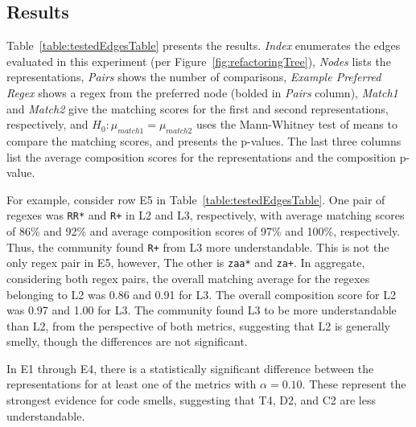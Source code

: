 \subsection{Results}
Table~\ref{table:testedEdgesTable} presents the results. 
\emph{Index}  enumerates the edges  evaluated in this experiment (per Figure~\ref{fig:refactoringTree}), \emph{Nodes} lists the representations, \emph{Pairs} shows the number of comparisons, \emph{Example Preferred Regex} shows a regex from the preferred node (bolded in \emph{Pairs} column), \emph{Match1} and \emph{Match2} give the matching scores for the first and second representations, respectively, and $H_0: \mu_{match1} = \mu_{match2}$ uses the Mann-Whitney test of means to compare the matching scores, and presents the p-values. The last three columns list the average composition scores for the representations and the composition p-value. 

For example, consider row E5 in Table~\ref{table:testedEdgesTable}. 
One pair of regexes was \verb!RR*! and \verb!R+! in L2 and L3, respectively, with average matching scores of 86\%  and 92\% and average composition scores of 97\%  and 100\%, respectively. 
Thus, the community found \verb!R+! from L3 more understandable. 
This is not the only regex pair in E5, however, The other is \verb!zaa*! and \verb!za+!. %
In aggregate, considering both regex pairs, the overall matching average for the regexes belonging to L2 was 0.86 and 0.91 for L3. 
The overall composition score for L2 was 0.97 and 1.00 for L3. 
The community found L3 to be more understandable than L2, from the perspective of both metrics, suggesting that L2 is generally smelly, though the differences are not significant. 



%
%
%
%
%



 In E1 through E4, there is a statistically significant difference between the representations for at least one of the metrics with $\alpha = 0.10$.  These represent the strongest evidence for code smells, suggesting that T4, D2, and C2 are less understandable. 


